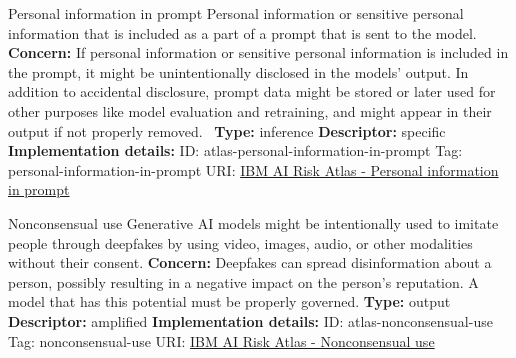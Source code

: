 \documentclass[a4paper,12pt]{article}
\begin{document}
\begin{definitionbox}{Personal information in prompt}
Personal information or sensitive personal information that is included as a part of a prompt that is sent to the model.\newline\newline
\textbf{Concern: }If personal information or sensitive personal information is included in the prompt, it might be unintentionally disclosed in the models' output. In addition to accidental disclosure, prompt data might be stored or later used for other purposes like model evaluation and retraining, and might appear in their output if not properly removed. \newline\newline
\textbf{Type: }inference\newline
\textbf{Descriptor: }specific \newline\newline
\textbf{Implementation details: } \newline
ID: atlas-personal-information-in-prompt \newline
Tag: personal-information-in-prompt \newline
URI:  \href{https://www.ibm.com/docs/en/watsonx/saas?topic=SSYOK8/wsj/ai-risk-atlas/personal-information-in-prompt.html}{IBM AI Risk Atlas - Personal information in prompt}\newline
\end{definitionbox}
\begin{definitionbox}{Nonconsensual use}
Generative AI models might be intentionally used to imitate people through deepfakes by using video, images, audio, or other modalities without their consent.\newline\newline
\textbf{Concern: }Deepfakes can spread disinformation about a person, possibly resulting in a negative impact on the person's reputation. A model that has this potential must be properly governed.\newline\newline
\textbf{Type: }output\newline
\textbf{Descriptor: }amplified \newline\newline
\textbf{Implementation details: } \newline
ID: atlas-nonconsensual-use \newline
Tag: nonconsensual-use \newline
URI:  \href{https://www.ibm.com/docs/en/watsonx/saas?topic=SSYOK8/wsj/ai-risk-atlas/nonconsensual-use.html}{IBM AI Risk Atlas - Nonconsensual use}\newline
\end{definitionbox}
\end{document}
